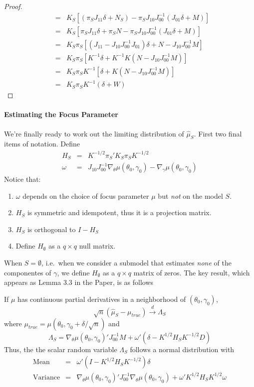 \begin{proof}
\begin{eqnarray*}
&=& K_S \left[ \left(\pi_S J_{11}\delta + N_S \right) - \pi_S J_{10}J_{00}^{-1}\left(J_{01}\delta + M\right) \right]\\
&=& K_S \left[ \pi_S J_{11}\delta + \pi_S N - \pi_S J_{10}J_{00}^{-1}\left(J_{01}\delta + M\right) \right]\\
&=& K_S \pi_S \left[ \left(J_{11} - J_{10}J_{00}^{-1}J_{01}\right)\delta + N - J_{10}J_{00}^{-1} M \right]\\
&=& K_S \pi_S \left[ K^{-1}\delta +K^{-1}K \left(N - J_{10}J_{00}^{-1} M \right)\right]\\
&=& K_S \pi_S K^{-1} \left[ \delta +K \left(N - J_{10}J_{00}^{-1} M \right)\right]\\
&=& K_S \pi_S K^{-1} \left( \delta + W\right)
\end{eqnarray*}
\end{proof}

\paragraph{Estimating the Focus Parameter} We're finally ready to work out the limiting distribution of $\widehat{\mu}_S$. 
First two final items of notation. 
Define
\begin{eqnarray*}
H_S &=& K^{-1/2}\pi_S' K_S \pi_SK^{-1/2} \\
\omega &=& J_{10}J_{00}^{-1} \nabla_\theta \mu(\theta_0,\gamma_0) - \nabla_\gamma \mu(\theta_0, \gamma_0)
\end{eqnarray*}
Notice that:
\begin{enumerate}
\item $\omega$ depends on the choice of focus parameter $\mu$ but \emph{not} on the model $S$.
\item $H_S$ is symmetric and idempotent, thus it is a projection matrix.
\item $H_S$ is orthogonal to $I - H_S$
\item Define $H_{\emptyset}$ as a $q\times q$ null matrix.
\end{enumerate}
When $S = \emptyset$, i.e.\ when we consider a submodel that estimates \emph{none} of the componentes of $\gamma$, we define $H_\emptyset$ as a $q\times q$ matrix of zeros. 
The key result, which appears as Lemma 3.3 in the Paper, is as follows
\begin{lem}
\label{lem:mu}
If $\mu$ has continuous partial derivatives in a neighborhood of $(\theta_0, \gamma_0)$,
$$
\sqrt{n}\left( \hat{\mu}_S - \mu_{true} \right) \overset{d}{\rightarrow} \Lambda_S
$$
where $\mu_{true} = \mu(\theta_0, \gamma_0+\delta/\sqrt{n})$ and
$$
\Lambda_S = \nabla_\theta \mu(\theta_0, \gamma_0)' J_{00}^{-1} M + \omega'\left( \delta - K^{1/2}H_S K^{-1/2}D\right)
$$
Thus, the the scalar random variable $\Lambda_S$ follows a normal distribution with
\begin{eqnarray*}
\mbox{Mean}&=&\omega'(I - K^{1/2}H_SK^{-1/2})\delta\\
\mbox{Variance}&=&\nabla_\theta \mu(\theta_0, \gamma_0)'J_{00}^{-1}\nabla_\theta \mu(\theta_0, \gamma_0) + \omega'K^{1/2}H_S K^{1/2}\omega
\end{eqnarray*}	
\end{lem}


